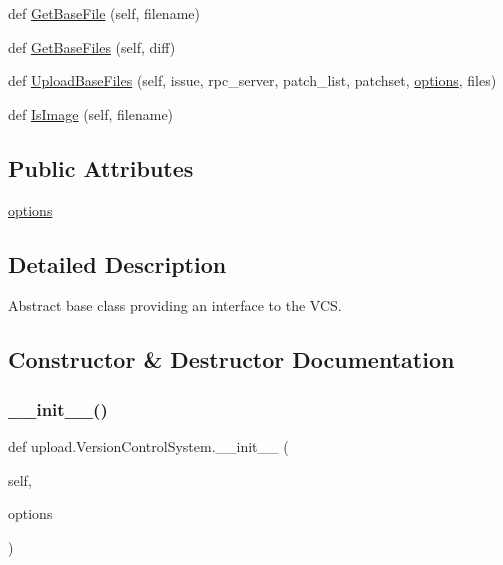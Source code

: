 \begin{DoxyCompactItemize}
\item 
def \mbox{\hyperlink{classupload_1_1VersionControlSystem_adfd9d4ecba422102233a2ba13e5bfaf5}{Get\+Base\+File}} (self, filename)
\item 
def \mbox{\hyperlink{classupload_1_1VersionControlSystem_a812c3b3daf90c88b015fa4b26252e291}{Get\+Base\+Files}} (self, diff)
\item 
def \mbox{\hyperlink{classupload_1_1VersionControlSystem_a7e334f967301b9e85e5a9c39f5036823}{Upload\+Base\+Files}} (self, issue, rpc\+\_\+server, patch\+\_\+list, patchset, \mbox{\hyperlink{classupload_1_1VersionControlSystem_a4d57d043bc408887b94269fe4cea9556}{options}}, files)
\item 
def \mbox{\hyperlink{classupload_1_1VersionControlSystem_a846889ecd2ef40870b456ddb5b349e02}{Is\+Image}} (self, filename)
\end{DoxyCompactItemize}
\subsection*{Public Attributes}
\begin{DoxyCompactItemize}
\item 
\mbox{\hyperlink{classupload_1_1VersionControlSystem_a4d57d043bc408887b94269fe4cea9556}{options}}
\end{DoxyCompactItemize}


\subsection{Detailed Description}
\begin{DoxyVerb}Abstract base class providing an interface to the VCS.\end{DoxyVerb}
 

\subsection{Constructor \& Destructor Documentation}
\mbox{\label{classupload_1_1VersionControlSystem_ace97e5785a2b40011404ae6fbb956ecf}} 
\subsubsection{\texorpdfstring{\_\_init\_\_()}{\_\_init\_\_()}\hspace{0.1cm}{\footnotesize\ttfamily [1/2]}}
{\footnotesize\ttfamily def upload.\+Version\+Control\+System.\+\_\+\+\_\+init\+\_\+\+\_\+ (\begin{DoxyParamCaption}\item[{}]{self,  }\item[{}]{options }\end{DoxyParamCaption})}

